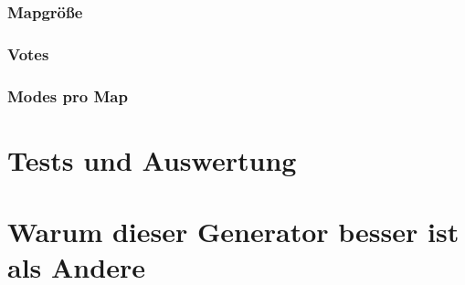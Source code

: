 \documentclass[a4paper, 11pt]{scrreprt}
\begin{document}
    \subsection{Mapgröße}
    \subsection{Votes}
    \subsection{Modes pro Map}

    \chapter{Tests und Auswertung}

    \chapter{Warum dieser Generator besser ist als Andere}
\end{document}
